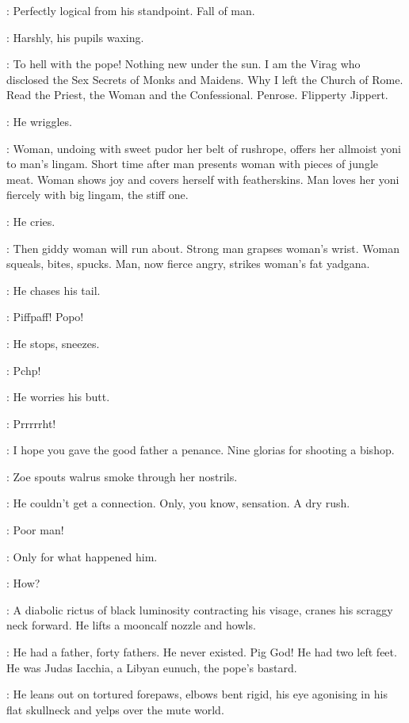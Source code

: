 \Virag:
Perfectly logical from his standpoint.
Fall of man.

:
Harshly,
his pupils waxing.

\Virag:
To hell with the pope!
Nothing new under the sun.
I am the Virag who disclosed the Sex Secrets of Monks and Maidens.
Why I left the Church of Rome.
Read the Priest,
the Woman and the Confessional.
Penrose.
Flipperty Jippert.

:
He wriggles.

\Virag:
Woman,
undoing with sweet pudor her belt of rushrope,
offers her allmoist yoni to man's lingam.
Short time after man presents woman with pieces of jungle meat.
Woman shows joy and covers herself with featherskins.
Man loves her yoni fiercely with big lingam,
the stiff one.

:
He cries.

\Virag:
Then giddy woman will run about.
Strong man grapses woman's wrist.
Woman squeals,
bites,
spucks.
Man,
now fierce angry,
strikes woman's fat yadgana.

:
He chases his tail.

\Virag:
Piffpaff!
Popo!

:
He stops,
sneezes.

\Virag:
Pchp!

:
He worries his butt.

\Virag:
Prrrrrht!

\Lynch[2]:
I hope you gave the good father a penance.
Nine glorias for shooting a bishop.

:
Zoe spouts walrus smoke through her nostrils.

\Zoe:
He couldn't get a connection.
Only,
you know,
sensation.
A dry rush.

\Bloom:
Poor man!

\Zoe:
Only for what happened him.

\Bloom:
How?

:
A diabolic rictus of black luminosity contracting his visage,
cranes his scraggy neck forward.
He lifts a mooncalf nozzle and howls.

\Virag:
He had a father,
forty fathers.
He never existed.
Pig God!
He had two left feet.
He was Judas Iacchia,
a Libyan eunuch,
the pope's bastard.

:
He leans out on tortured forepaws,
elbows bent rigid,
his eye agonising in his flat skullneck and yelps over the mute world.

